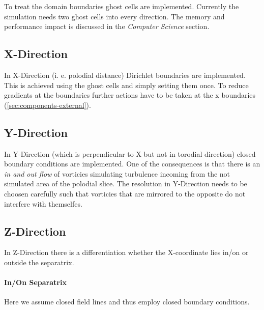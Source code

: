 To treat the domain boundaries ghost cells are implemented. Currently the simulation needs two ghost cells into every direction. The memory and performance impact is discussed in the \textit{Computer Science} section.
\subsection{X-Direction}
In X-Direction (i. e. polodial distance) Dirichlet boundaries are implemented. This is achieved using the ghost cells and simply setting them once. To reduce gradients at the boundaries further actions have to be taken at the x boundaries (\autoref{sec:components-external}).
\subsection{Y-Direction}
In Y-Direction (which is perpendicular to X but not in torodial direction) closed boundary conditions are implemented. One of the consequences is that there is an \textit{in and out flow} of vorticies simulating turbulence incoming from the not simulated area of the polodial slice. The resolution in Y-Direction needs to be choosen carefully such that vorticies that are mirrored to the opposite do not interfere with themselfes. 
\subsection{Z-Direction}
In Z-Direction there is a differentiation whether the X-coordinate lies in/on or outside the separatrix.
\paragraph{In/On Separatrix}
Here we assume closed field lines and thus employ closed boundary conditions.
